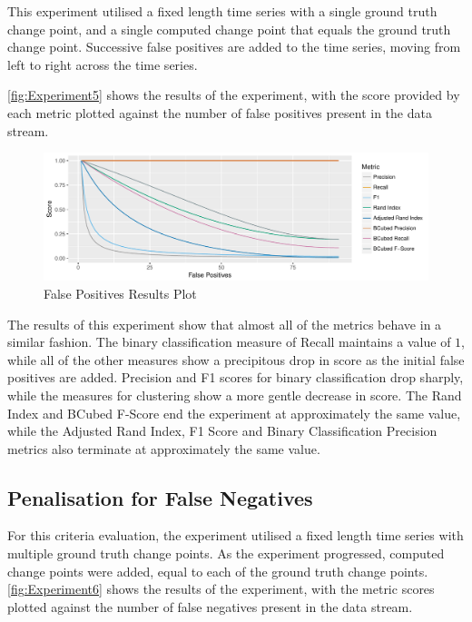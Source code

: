 \documentclass{uvamscse}	%
\begin{document}
This experiment utilised a fixed length time series with a single ground truth change point, and a single computed change point that equals the ground truth change point. Successive false positives are added to the time series, moving from left to right across the time series.

\autoref{fig:Experiment5} shows the results of the experiment, with the score provided by each metric plotted against the number of false positives present in the data stream.

\begin{figure}[h]
    \includegraphics[width=\textwidth]{figures/Experiment5}
    \caption{False Positives Results Plot}
    \label{fig:Experiment5}
\end{figure}

The results of this experiment show that almost all of the metrics behave in a similar fashion. The binary classification measure of Recall maintains a value of $1$, while all of the other measures  show a precipitous drop in score as the initial false positives are added. Precision and F1 scores for binary classification drop sharply, while the measures for clustering show a more gentle decrease in score. The Rand Index and BCubed F-Score end the experiment at approximately the same value, while the Adjusted Rand Index, F1 Score and Binary Classification Precision metrics also terminate at approximately the same value.

\subsection{Penalisation for False Negatives}

For this criteria evaluation, the experiment utilised a fixed length time series with multiple ground truth change points. As the experiment progressed, computed change points were added, equal to each of the ground truth change points. \autoref{fig:Experiment6} shows the results of the experiment, with the metric scores plotted against the number of false negatives present in the data stream.
\end{document}
